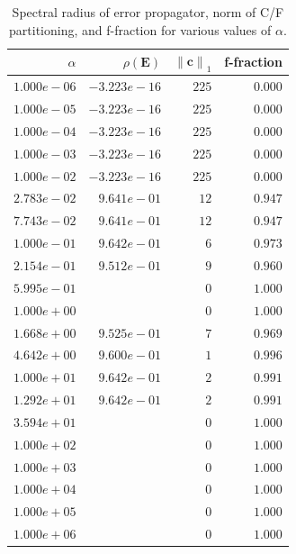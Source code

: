 \documentclass{article}
\newcommand{\norm}[1]{\left\lVert#1\right\rVert}
\newcommand{\mat}[1]{\bm{{#1}}}
\renewcommand{\vec}[1]{\bm{{#1}}}
\begin{document}
\begin{table}[h]
  \center
  \begin{tabular}{|r|r|r|r|}
    \hline
    $\alpha$ & $\rho\left(\mat{E}\right)$ & $\norm{\vec{c}}_1$ & f-fraction \\
    \hline
$1.000e-06$ & $-3.223e-16$ & $225$ & $0.000$ \\
$1.000e-05$ & $-3.223e-16$ & $225$ & $0.000$ \\
$1.000e-04$ & $-3.223e-16$ & $225$ & $0.000$ \\
$1.000e-03$ & $-3.223e-16$ & $225$ & $0.000$ \\
$1.000e-02$ & $-3.223e-16$ & $225$ & $0.000$ \\
$2.783e-02$ & $9.641e-01$ & $12$ & $0.947$ \\
$7.743e-02$ & $9.641e-01$ & $12$ & $0.947$ \\
$1.000e-01$ & $9.642e-01$ & $6$ & $0.973$ \\
$2.154e-01$ & $9.512e-01$ & $9$ & $0.960$ \\
$5.995e-01$ &  & $0$ & $1.000$ \\
$1.000e+00$ &  & $0$ & $1.000$ \\
$1.668e+00$ & $9.525e-01$ & $7$ & $0.969$ \\
$4.642e+00$ & $9.600e-01$ & $1$ & $0.996$ \\
$1.000e+01$ & $9.642e-01$ & $2$ & $0.991$ \\
$1.292e+01$ & $9.642e-01$ & $2$ & $0.991$ \\
$3.594e+01$ &  & $0$ & $1.000$ \\
$1.000e+02$ &  & $0$ & $1.000$ \\
$1.000e+03$ &  & $0$ & $1.000$ \\
$1.000e+04$ &  & $0$ & $1.000$ \\
$1.000e+05$ &  & $0$ & $1.000$ \\
$1.000e+06$ &  & $0$ & $1.000$ \\
\hline
  \end{tabular}
  \caption{Spectral radius of error propagator, norm of C/F partitioning, and f-fraction for various values of $\alpha$.}
  \label{tab:values}
\end{table}
\end{document}
